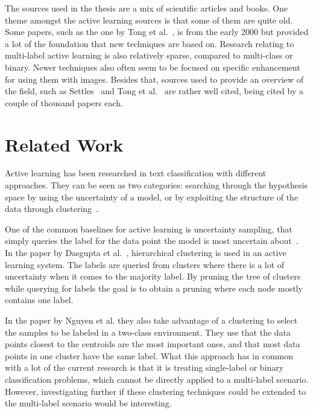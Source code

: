 The sources used in the thesis are a mix of scientific articles and books.
One theme amongst the active learning sources is that some of them are quite old.
Some papers, such as the one by Tong et al.~\cite{tong2001support}, is from the early 2000 but provided a lot of the foundation that new techniques are based on.
Research relating to multi-label active learning is also relatively sparse, compared to multi-class or binary.
Newer techniques also often seem to be focused on specific enhancement for using them with images.
Besides that, sources used to provide an overview of the field, such as Settles~\cite{settles2012active} and Tong et al\@.~\cite{tong2001active} are rather well cited, being cited by a couple of thousand papers each.


\section{Related Work}

Active learning has been researched in text classification with different approaches.
They can be seen as two categories: searching through the hypothesis space by using the uncertainty of a model, or by exploiting the structure of the data through clustering~\cite{dasgupta2008hierarchical}.

One of the common baselines for active learning is uncertainty sampling, that simply queries the label for the data point the model is most uncertain about~\cite{lewis1994sequential}.
In the paper by Dasgupta et al\@.~\cite{dasgupta2008hierarchical}, hierarchical clustering is used in an active learning system.
The labels are queried from clusters where there is a lot of uncertainty when it comes to the majority label.
By pruning the tree of clusters while querying for labels the goal is to obtain a pruning where each node mostly contains one label.

In the paper by Nguyen et al\@.\cite{nguyen2004active} they also take advantage of a clustering to select the samples to be labeled in a two-class environment.
They use that the data points closest to the centroids are the most important ones, and that most data points in one cluster have the same label.
What this approach has in common with a lot of the current research is that it is treating single-label or binary classification problems, which cannot be directly applied to a multi-label scenario.
However, investigating further if these clustering techniques could be extended to the multi-label scenario would be interesting.

